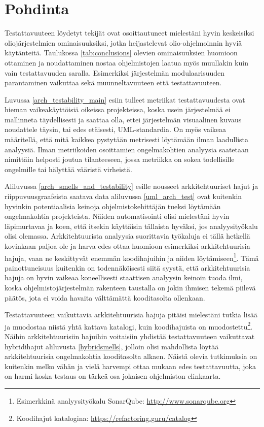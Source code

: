 \documentclass[finnish]{tktltiki2}
\numberwithin{table}{section}
\theoremstyle{definition}
\theoremstyle{remark}
\begin{document}
\newpage



\section{Pohdinta} \label{pondering}


Testattavuuteen löydetyt tekijät ovat osoittautuneet mielestäni hyvin keskeisiksi oliojärjestelmien ominaisuuksiksi, jotka heijastelevat olio-ohjelmoinnin hyviä käytänteitä. Taulukossa \ref{tab:conclusions} olevien ominaisuuksien huomioon ottaminen ja noudattaminen nostaa ohjelmistojen laatua myös muullakin kuin vain testattavuuden saralla. Esimerkiksi järjestelmän modulaarisuuden parantaminen vaikuttaa sekä muunneltavuuteen että testattavuuteen.

Luvussa \ref{arch_testability_main} esiin tulleet metriikat testattavuudesta ovat hieman vaikeakäyttöisiä oikeissa projekteissa, koska usein järjestelmää ei mallinneta täydellisesti ja saattaa olla, ettei järjestelmän visuaalinen kuvaus noudattele täysin, tai edes etäisesti, UML-standardia. On myös vaikeaa määritellä, että mitä kaikkea pystytään metrisesti löytämään ilman laadullista analyysiä. Ilman metriikoiden osoittamien ongelmakohtien analyysia saatetaan nimittäin helposti joutua tilanteeseen, jossa metriikka on sokea todellisille ongelmille tai hälyttää vääristä virheistä. 

Aliluvussa \ref{arch_smells_and_testability} esille nousseet arkkitehtuuriset hajut ja riippuvuusgraafeista saatava data aliluvussa \ref{uml_arch_test} ovat kuitenkin hyvinkin potentiaalisia keinoja ohjelmistokehittäjän tueksi löytämään ongelmakohtia projekteista. Näiden automatisointi olisi mielestäni hyvin läpimurtavaa ja koen, että itsekin käyttäisin tällaista hyväksi, jos analyysityökalu olisi olemassa. Arkkitehtuurista analyysia suorittavia työkaluja ei tällä hetkellä kovinkaan paljoa ole ja harva edes ottaa huomioon esimerkiksi arkkitehtuurisia hajuja, vaan ne keskittyvät enemmän koodihajuihin ja niiden löytämiseen\footnote{Esimerkkinä analyysityökalu SonarQube: \url{http://www.sonarqube.org}}. Tämä painottuneisuus kuitenkin on todennäköisesti siitä syystä, että arkkitehtuurisia hajuja on hyvin vaikeaa koneellisesti staattisen analyysin keinoin tuoda ilmi, koska ohjelmistojärjestelmän rakenteen taustalla on jokin ihmisen tekemä piilevä päätös, jota ei voida havaita välttämättä kooditasolta ollenkaan.

Testattavuuteen vaikuttavia arkkitehtuurisia hajuja pitäisi mielestäni tutkia lisää ja muodostaa niistä yhtä kattava katalogi, kuin koodihajuista on muodostettu\footnote{Koodihajut katalogina: \url{https://refactoring.guru/catalog}}. Näihin arkkitehtuurisiin hajuihin voitaisiin yhdistää testattavuuteen vaikuttavat hybridihajut aliluvusta \ref{hybridsmells}, jolloin olisi mahdollista löytää arkkitehtuurisia ongelmakohtia kooditasolta alkaen. Näistä olevia tutkimuksia on kuitenkin melko vähän ja vielä harvempi ottaa mukaan edes testattavuutta, joka on harmi koska testaus on tärkeä osa jokaisen ohjelmiston elinkaarta.
\end{document}
